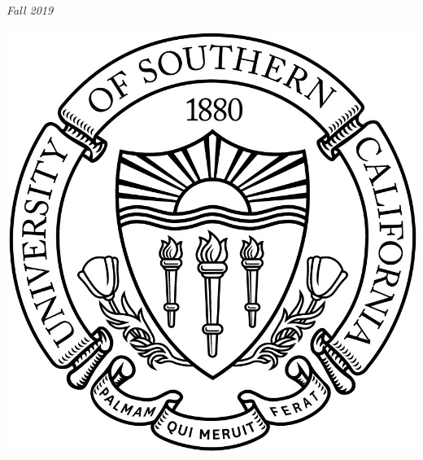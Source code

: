 \begin{titlepage}
	\textit{Fall 2019} %

	\vspace{4\baselineskip} %
	

    \includegraphics{seal}

\end{titlepage}



